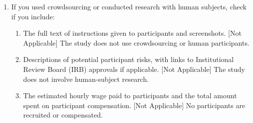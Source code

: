 \begin{enumerate}
  \item If you used crowdsourcing or conducted research with human subjects, check if you include:
  \begin{enumerate}
    \item The full text of instructions given to participants and screenshots. [Not Applicable]
    The study does not use crowdsourcing or human participants.
    \item Descriptions of potential participant risks, with links to Institutional Review Board (IRB) approvals if applicable. [Not Applicable]
    The study does not involve human-subject research.
    \item The estimated hourly wage paid to participants and the total amount spent on participant compensation. [Not Applicable]
    No participants are recruited or compensated.
  \end{enumerate}

\end{enumerate}
